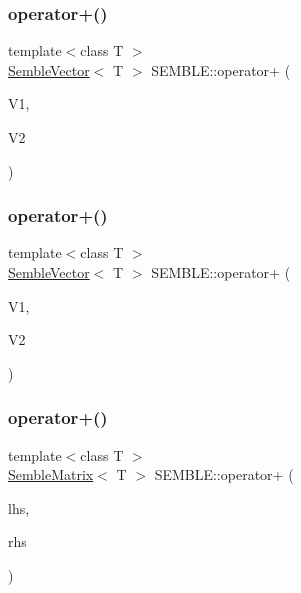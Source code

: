 \mbox{\label{namespaceSEMBLE_a658a80a09f4330c5ee6f74ce0577539a}} 
\subsubsection{\texorpdfstring{operator+()}{operator+()}\hspace{0.1cm}{\footnotesize\ttfamily [2/6]}}
{\footnotesize\ttfamily template$<$class T $>$ \\
\mbox{\hyperlink{structSEMBLE_1_1SembleVector}{Semble\+Vector}}$<$ T $>$ S\+E\+M\+B\+L\+E\+::operator+ (\begin{DoxyParamCaption}\item[{const \mbox{\hyperlink{structSEMBLE_1_1SembleVector}{Semble\+Vector}}$<$ T $>$ \&}]{V1,  }\item[{const itpp\+::\+Vec$<$ T $>$ \&}]{V2 }\end{DoxyParamCaption})}

\mbox{\label{namespaceSEMBLE_a303a3a629ed9e04ceeae416ecaf0111f}} 
\subsubsection{\texorpdfstring{operator+()}{operator+()}\hspace{0.1cm}{\footnotesize\ttfamily [3/6]}}
{\footnotesize\ttfamily template$<$class T $>$ \\
\mbox{\hyperlink{structSEMBLE_1_1SembleVector}{Semble\+Vector}}$<$ T $>$ S\+E\+M\+B\+L\+E\+::operator+ (\begin{DoxyParamCaption}\item[{const itpp\+::\+Vec$<$ T $>$ \&}]{V1,  }\item[{const \mbox{\hyperlink{structSEMBLE_1_1SembleVector}{Semble\+Vector}}$<$ T $>$ \&}]{V2 }\end{DoxyParamCaption})}

\mbox{\label{namespaceSEMBLE_ac104727835e106d1d22472dd2abe9722}} 
\subsubsection{\texorpdfstring{operator+()}{operator+()}\hspace{0.1cm}{\footnotesize\ttfamily [4/6]}}
{\footnotesize\ttfamily template$<$class T $>$ \\
\mbox{\hyperlink{structSEMBLE_1_1SembleMatrix}{Semble\+Matrix}}$<$ T $>$ S\+E\+M\+B\+L\+E\+::operator+ (\begin{DoxyParamCaption}\item[{const \mbox{\hyperlink{structSEMBLE_1_1SembleMatrix}{Semble\+Matrix}}$<$ T $>$ \&}]{lhs,  }\item[{const \mbox{\hyperlink{structSEMBLE_1_1SembleMatrix}{Semble\+Matrix}}$<$ T $>$ \&}]{rhs }\end{DoxyParamCaption})}

